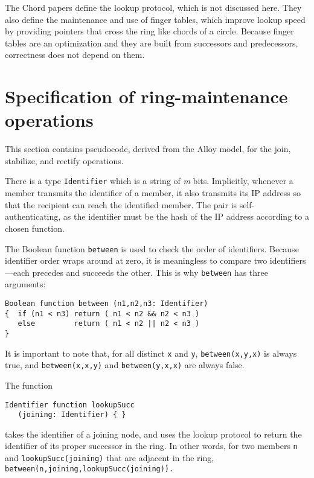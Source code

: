 \documentclass[conference]{IEEEtran}
\begin{document}
The Chord papers define the lookup protocol, which is not discussed here.
They also define the maintenance and use of finger tables, which 
improve lookup speed
by providing pointers that cross the ring like
chords of a circle.
Because finger tables are an optimization and 
they are built from successors and predecessors, correctness
does not depend on them.

\section{Specification of ring-maintenance operations}
\label{sec:spec}

This section contains pseudocode, derived from the Alloy model,
for the join, stabilize, and rectify operations.

There is a type 
\small
{\tt Identifier}
\normalsize
which is a string of {\it m} bits.
Implicitly, whenever a member transmits the identifier of a member, it
also transmits its IP address so that the recipient can reach the 
identified member.
The pair is self-authenticating, as the identifier must be the hash of the
IP address according to a chosen function.

The Boolean function 
\small
{\tt between}
\normalsize
is used to check the order of
identifiers.
Because identifier order wraps around at zero,
it is meaningless to compare two identifiers---each precedes
and succeeds the other.
This is why 
\small
{\tt between}
\normalsize
has three arguments:
\small
\begin{verbatim}
Boolean function between (n1,n2,n3: Identifier) 
{  if (n1 < n3) return ( n1 < n2 && n2 < n3 )
   else         return ( n1 < n2 || n2 < n3 )     
}
\end{verbatim}
\normalsize
It is important to note that, for all distinct 
\small
{\tt x}
\normalsize
and 
\small
{\tt y}, {\tt between(x,y,x)}
\normalsize
is always true, 
and 
\small
{\tt between(x,x,y)}
\normalsize
and
\small
{\tt between(y,x,x)}
\normalsize
are always false.

The function
\small
\begin{verbatim}
Identifier function lookupSucc 
   (joining: Identifier) { }
\end{verbatim}
\normalsize
takes the identifier of a joining node, and uses the lookup
protocol to return the identifier of
its proper successor in the ring.
In other words, for two members 
\small
{\tt n}
\normalsize
and
\small
{\tt lookupSucc(joining)}
\normalsize
that are adjacent in the ring,
\small
{\tt between(n,joining,lookupSucc(joining)).}
\normalsize
\end{document}
